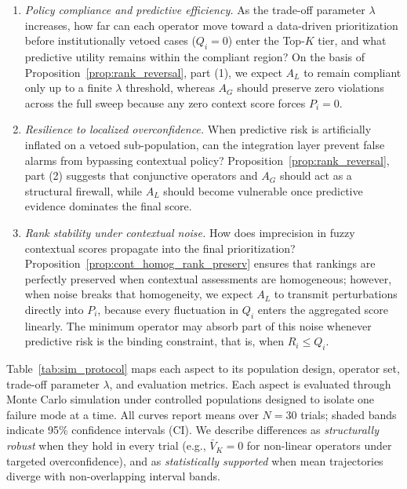 \documentclass[mathematics,article,submit,moreauthors]{Definitions/mdpi}
\begin{document}
\begin{enumerate}
    \item \emph{Policy compliance and predictive efficiency.} As the trade-off parameter $\lambda$ increases, how far can each operator move toward a data-driven prioritization before institutionally vetoed cases ($Q_i = 0$) enter the Top-$K$ tier, and what predictive utility remains within the compliant region? On the basis of Proposition~\ref{prop:rank_reversal}, part (1), we expect $A_L$ to remain compliant only up to a finite $\lambda$ threshold, whereas $A_G$ should preserve zero violations across the full sweep because any zero context score forces $P_i = 0$.

    \item \emph{Resilience to localized overconfidence.} When predictive risk is artificially inflated on a vetoed sub-population, can the integration layer prevent false alarms from bypassing contextual policy? Proposition~\ref{prop:rank_reversal}, part (2) suggests that conjunctive operators and $A_G$ should act as a structural firewall, while $A_L$ should become vulnerable once predictive evidence dominates the final score.

    \item \emph{Rank stability under contextual noise.} How does imprecision in fuzzy contextual scores propagate into the final prioritization? Proposition~\ref{prop:cont_homog_rank_preserv} ensures that rankings are perfectly preserved when contextual assessments are homogeneous; however, when noise breaks that homogeneity, we expect $A_L$ to transmit perturbations directly into $P_i$, because every fluctuation in $Q_i$ enters the aggregated score linearly. The minimum operator may absorb part of this noise whenever predictive risk is the binding constraint, that is, when $R_i \leq Q_i$.
\end{enumerate}
Table~\ref{tab:sim_protocol} maps each aspect to its population design, operator set, trade-off parameter $\lambda$, and evaluation metrics. Each aspect is evaluated through Monte Carlo simulation under controlled populations designed to isolate one failure mode at a time. All curves report means over $N = 30$ trials; shaded bands indicate 95\% confidence intervals (CI). We describe differences as \emph{structurally robust} when they hold in every trial (e.g., $\bar{V}_K = 0$ for non-linear operators under targeted overconfidence), and as \emph{statistically supported} when mean trajectories diverge with non-overlapping interval bands.
\end{document}
